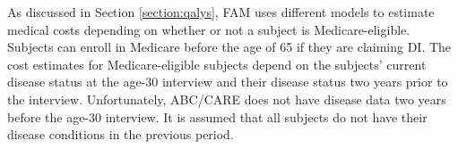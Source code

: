\noindent As discussed in Section \ref{section:qalys}, FAM uses different models to estimate medical costs depending on whether or not a subject is Medicare-eligible. Subjects can enroll in Medicare before the age of 65 if they are claiming DI. The cost estimates for Medicare-eligible subjects depend on the subjects' current disease status at the age-30 interview and their disease status two years prior to the interview. Unfortunately, ABC/CARE does not have disease data two years before the age-30 interview. It is assumed that all subjects do not have their disease conditions in the previous period.










